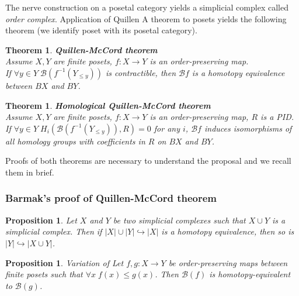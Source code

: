 \documentclass[a4paper, 12pt]{article}
\newcounter{stmcounter}[section]
\newcounter{thcounter}
\numberwithin{equation}{section}
\newtheorem{proposition}[stmcounter]{Proposition}
\newtheorem{theorem}[thcounter]{Theorem}
\theoremstyle{definition}
\theoremstyle{remark}
\newcommand{\define}[1]{{\textit{#1}}}
\renewcommand{\leq}{\leqslant}
\begin{document}
The nerve construction on a posetal category yields a simplicial complex called \define{order complex}. Application of Quillen A theorem to posets yields the following theorem (we identify poset with its posetal category).

\begin{theorem} \textbf{Quillen-McCord theorem}\\
  Assume $X, Y$ are finite posets, $f : X \to Y$ is an order-preserving map.\\
  If $\forall y \in Y\;\mathcal{B}(f^{-1}(Y_{\leqslant y}))$ is contractible, then $\mathcal{B}f$ is a homotopy equivalence between $BX$ and $BY$.\\
\end{theorem}

\begin{theorem} \textbf{Homological Quillen-McCord theorem} {\cite[Corollary 5.5]{Bar11}}\\
  Assume $X, Y$ are finite posets, $f : X \to Y$ is an order-preserving map, $R$ is a PID.\\
  If $\forall y \in Y\;H_i(\mathcal{B}(f^{-1}(Y_{\leqslant y})),R) = 0$ for any $i$, $\mathcal{B}f$ induces isomorphisms of all homology groups with coefficients in $R$ on $BX$ and $BY$.\\
\end{theorem}

Proofs of both theorems are necessary to understand the proposal and we recall them in brief.

\subsubsection{Barmak's proof of Quillen-McCord theorem}

\begin{proposition} {\cite[Proposition 2.1]{Bar11}}
  \label{prop:homotopy_t}
  Let $X$ and $Y$ be two simplicial complexes such that $X \cup Y$ is a simplicial complex. Then if $\left|X\right| \cup \left|Y\right| \hookrightarrow \left|X\right|$ is a homotopy equivalence, then so is $\left|Y\right| \hookrightarrow \left|X \cup Y\right|$.
\end{proposition}

\begin{proposition} {Variation of \cite[Proposition 2.2]{Bar11}}
  \label{prop:comparison}
  Let $f,g : X \to Y$ be order-preserving maps between finite posets such that $\forall x\;f(x) \leq g(x)$. Then $\mathcal{B}(f)$ is homotopy-equivalent to $\mathcal{B}(g)$.
\end{proposition}
\end{document}
